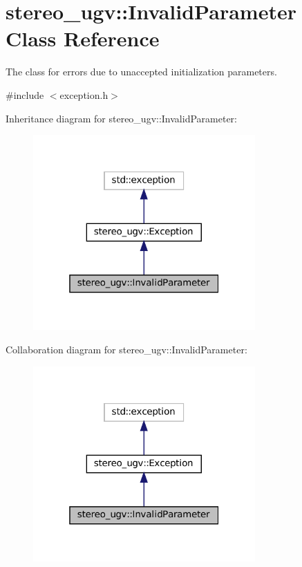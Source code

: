 \hypertarget{classstereo__ugv_1_1InvalidParameter}{}\section{stereo\+\_\+ugv\+:\+:Invalid\+Parameter Class Reference}
\label{classstereo__ugv_1_1InvalidParameter}


The class for errors due to unaccepted initialization parameters.  




{\ttfamily \#include $<$exception.\+h$>$}



Inheritance diagram for stereo\+\_\+ugv\+:\+:Invalid\+Parameter\+:\nopagebreak
\begin{figure}[H]
\begin{center}
\leavevmode
\includegraphics[width=241pt]{classstereo__ugv_1_1InvalidParameter__inherit__graph}
\end{center}
\end{figure}


Collaboration diagram for stereo\+\_\+ugv\+:\+:Invalid\+Parameter\+:\nopagebreak
\begin{figure}[H]
\begin{center}
\leavevmode
\includegraphics[width=241pt]{classstereo__ugv_1_1InvalidParameter__coll__graph}
\end{center}
\end{figure}
